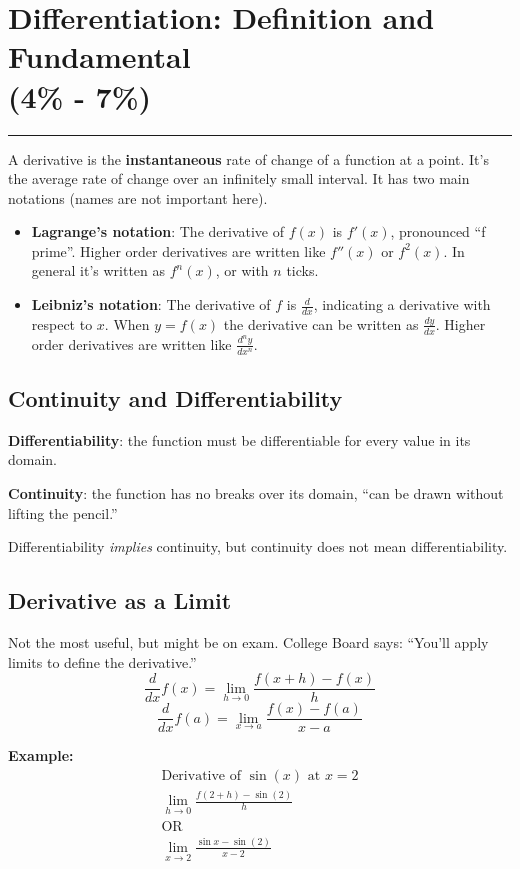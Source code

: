 \documentclass[12pt]{article}
\newcommand{\fline}{\par\noindent\rule{\textwidth}{0.1pt}} %
\begin{document}
\section[Differentiation: Definition and Fundamental Properties (4\% - 7\%)]{Differentiation: Definition and Fundamental \\ (4\% - 7\%)}
\fline

A derivative is the \textbf{instantaneous} rate of change of a function at a point. It's the average rate of change over an infinitely small interval. It has two main notations (names are not important here).
\begin{itemize} %
    \item \textbf{Lagrange's notation}:
          The derivative of $f(x)$ is $f'(x)$, pronounced ``f prime''. Higher order derivatives are written like $f''(x)$ or $f^2(x)$. In general it's written as $f^{n}(x)$, or with $n$ ticks.
    \item \textbf{Leibniz's notation}:
          The derivative of $f$ is $\frac{d}{dx}$, indicating a derivative with respect to $x$. When $y=f(x)$ the derivative can be written as $\frac{dy}{dx}$. Higher order derivatives are written like $\frac{d^{n}y}{dx^{n}}$.
\end{itemize}

\subsection{Continuity and Differentiability}
\noindent \textbf{Differentiability}: the function must be differentiable for every value in its domain.

\noindent \textbf{Continuity}: the function has no breaks over its domain, ``can be drawn without lifting the pencil.''

\noindent Differentiability \textit{implies} continuity, but continuity does not mean differentiability.

\subsection{Derivative as a Limit}
Not the most useful, but might be on exam. College Board says: ``You'll apply limits to define the derivative.''
\[ \frac{d}{dx} f(x) = \lim_{h \to 0} \frac{f(x+h) - f(x)}{h} \]
\[ \frac{d}{dx} f(a) = \lim_{x \to a} \frac{f(x) - f(a)}{x-a} \]

\noindent \textbf{Example:}
\begin{gather*}
    \text{Derivative of $\sin(x)$ at $x=2$} \\
    \lim_{h \to 0} \frac{f(2+h) - \sin{(2)}}{h} \\
    \text{OR} \\
    \lim_{x \to 2} \frac{\sin{x} - \sin{(2)}}{x-2}
\end{gather*}
\end{document}
